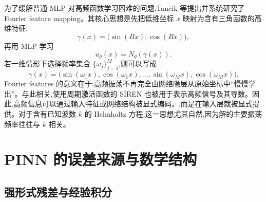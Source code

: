 \documentclass[12pt,hyperref,a4paper,UTF8,twoside]{ctexart}
\begin{document}
为了缓解普通 MLP 对高频函数学习困难的问题,Tancik 等\cite{tancik2020fourier}提出并系统研究了 Fourier feature mapping。其核心思想是先把低维坐标 $x$ 映射为含有三角函数的高维特征:
\begin{equation}\label{eq:fourier-feature}
    \gamma(x)=\bigl(\sin(Bx),\cos(Bx)\bigr),
\end{equation}
再用 MLP 学习
\begin{equation}\label{eq:fourier-network}
    u_\theta(x)=N_\theta(\gamma(x)).
\end{equation}
若一维情形下选择频率集合 $\{\omega_j\}_{j=1}^M$,则可以写成
\begin{equation}\label{eq:feature-vector-1d}
    \gamma(x)=\bigl(\sin(\omega_1x),\cos(\omega_1x),\dots,
    \sin(\omega_Mx),\cos(\omega_Mx)\bigr).
\end{equation}
Fourier features 的意义在于:高频振荡不再完全由网络隐层从原始坐标中“慢慢学出”。与此相关,使用周期激活函数的 SIREN 也被用于表示高频信号及其导数\cite{sitzmann2020implicit}。因此,高频信息可以通过输入特征或网络结构被显式编码。,而是在输入层就被显式提供。对于含有已知波数 $k$ 的 Helmholtz 方程,这一思想尤其自然,因为解的主要振荡频率往往与 $k$ 相关。

\section{PINN 的误差来源与数学结构}

\subsection{强形式残差与经验积分}
\end{document}
